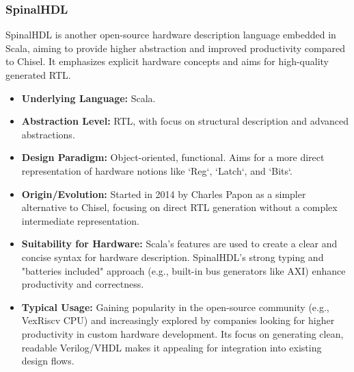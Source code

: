 \documentclass[sigconf, anonymous=false]{acmart} %
\begin{document}
\subsubsection{SpinalHDL}
SpinalHDL is another open-source hardware description language embedded in Scala, aiming to provide higher abstraction and improved productivity compared to Chisel. It emphasizes explicit hardware concepts and aims for high-quality generated RTL.
\begin{itemize}
    \item \textbf{Underlying Language:} Scala.
    \item \textbf{Abstraction Level:} RTL, with focus on structural description and advanced abstractions.
    \item \textbf{Design Paradigm:} Object-oriented, functional. Aims for a more direct representation of hardware notions like `Reg`, `Latch`, and `Bits`.
    \item \textbf{Origin/Evolution:} Started in 2014 by Charles Papon as a simpler alternative to Chisel, focusing on direct RTL generation without a complex intermediate representation.
    \item \textbf{Suitability for Hardware:} Scala's features are used to create a clear and concise syntax for hardware description. SpinalHDL's strong typing and "batteries included" approach (e.g., built-in bus generators like AXI) enhance productivity and correctness.
    \item \textbf{Typical Usage:} Gaining popularity in the open-source community (e.g., VexRiscv CPU) and increasingly explored by companies looking for higher productivity in custom hardware development. Its focus on generating clean, readable Verilog/VHDL makes it appealing for integration into existing design flows.
\end{itemize}
\end{document}
